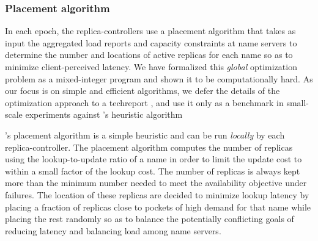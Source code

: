 \subsubsection{Placement algorithm} 
\vsp

In each epoch, the replica-controllers use a {placement algorithm} that takes as input the aggregated load reports and capacity constraints at name servers to determine the number and locations of active replicas for each name so as to minimize client-perceived latency. We have formalized this {\em global} optimization problem as a mixed-integer program and shown it to be computationally hard.  As our focus is on simple and efficient algorithms, we defer the details of the optimization approach to a techreport \cite{techreportAuspice}, and use it only as a benchmark in small-scale experiments against \auspice's heuristic algorithm%


\auspice's placement algorithm is a simple heuristic  and can be run {\em locally} by each replica-controller. The placement algorithm computes the number of replicas using the lookup-to-update ratio of a name in order to limit the update cost to within a small factor of the lookup cost. The number of replicas is always kept more than the minimum number needed to meet the availability objective under failures.   The location of these replicas are decided to minimize lookup latency by placing a fraction of replicas close to pockets of high demand for that name while placing the rest randomly so as to balance the potentially conflicting goals of reducing latency and balancing load among name servers.

